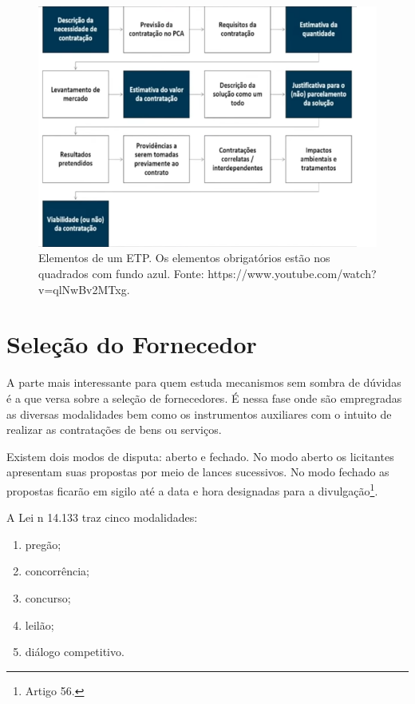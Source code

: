 \begin{figure}
    \centering
    \includegraphics[scale=0.6]{conteudo/imagens/ETP.png}
    \caption{Elementos de um ETP. Os elementos obrigatórios estão nos quadrados com fundo azul. Fonte: https://www.youtube.com/watch?v=qlNwBv2MTxg.}
    \label{fig:ETP}
\end{figure}

\section{Seleção do Fornecedor}

A parte mais interessante para quem estuda mecanismos sem sombra de dúvidas é a que versa sobre a seleção de fornecedores. É nessa fase onde são empregradas as diversas modalidades bem como os instrumentos auxiliares com o intuito de realizar as contratações de bens ou serviços.

Existem dois modos de disputa: aberto e fechado. No modo aberto os licitantes apresentam suas propostas por meio de lances sucessivos. No modo fechado as propostas ficarão em sigilo até a data e hora designadas para a divulgação\footnote{Artigo 56.}.

A Lei n{\textordmasculine} 14.133 traz cinco modalidades:
\begin{enumerate}
    \item {pregão;}
    \item {concorrência;}
    \item {concurso;}
    \item {leilão;}
    \item {diálogo competitivo.}
\end{enumerate}

